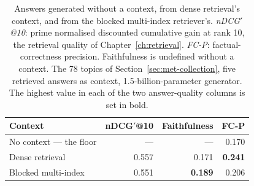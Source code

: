 \begin{table}[!t]
\centering
\small
\renewcommand{\arraystretch}{1.15}
\begin{tabular}{lrrr}
\toprule
Context & nDCG$'$@10 & Faithfulness & FC-P \\
\midrule
No context --- the floor & ---   & ---   & 0.170 \\
Dense retrieval          & 0.557 & 0.171 & \textbf{0.241} \\
Blocked multi-index      & 0.551 & \textbf{0.189} & 0.206 \\
\bottomrule
\end{tabular}
\caption[What the retrieved context changes]{Answers generated without a context, from dense retrieval's context, and from the
blocked multi-index retriever's. \emph{nDCG$'$@10}: prime normalised discounted cumulative
gain at rank 10, the retrieval quality of Chapter~\ref{ch:retrieval}. \emph{FC-P}:
factual-correctness precision. Faithfulness is undefined without a context. The 78 topics of
Section~\ref{sec:met-collection}, five retrieved answers as context, 1.5-billion-parameter
generator. The highest value in each of the two answer-quality columns is set in bold.}
\label{tab:gen-res-context}
\end{table}


